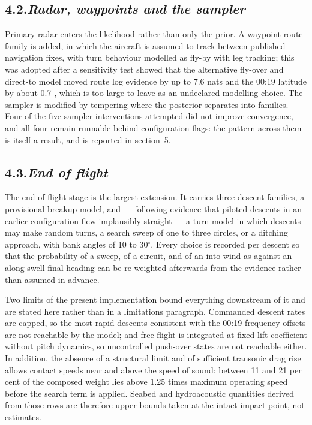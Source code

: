 \documentclass[12pt,a4paper]{article}
\begin{document}
\subsection*{4.2.\quad \textit{Radar, waypoints and the sampler}}

Primary radar enters the likelihood rather than only the prior. A waypoint route family is added,
in which the aircraft is assumed to track between published navigation fixes, with turn
behaviour modelled as fly-by with leg tracking; this was adopted after a sensitivity test showed
that the alternative fly-over and direct-to model moved route log evidence by up to 7.6 nats and
the 00:19 latitude by about 0.7$^\circ$, which is too large to leave as an undeclared modelling
choice. The sampler is modified by tempering where the posterior separates into families. Four
of the five sampler interventions attempted did not improve convergence, and all four remain
runnable behind configuration flags: the pattern across them is itself a result, and is reported
in section~5.

\subsection*{4.3.\quad \textit{End of flight}}

The end-of-flight stage is the largest extension. It carries three descent families, a provisional
breakup model, and --- following evidence that piloted descents in an earlier configuration flew
implausibly straight --- a turn model in which descents may make random turns, a search sweep of
one to three circles, or a ditching approach, with bank angles of 10 to 30$^\circ$. Every choice
is recorded per descent so that the probability of a sweep, of a circuit, and of an into-wind as
against an along-swell final heading can be re-weighted afterwards from the evidence rather than
assumed in advance.

Two limits of the present implementation bound everything downstream of it and are stated here
rather than in a limitations paragraph. Commanded descent rates are capped, so the most rapid
descents consistent with the 00:19 frequency offsets are not reachable by the model; and free
flight is integrated at fixed lift coefficient without pitch dynamics, so uncontrolled push-over
states are not reachable either. In addition, the absence of a structural limit and of sufficient
transonic drag rise allows contact speeds near and above the speed of sound: between 11 and 21
per cent of the composed weight lies above 1.25 times maximum operating speed before the search
term is applied. Seabed and hydroacoustic quantities derived from those rows are therefore upper
bounds taken at the intact-impact point, not estimates.
\end{document}
